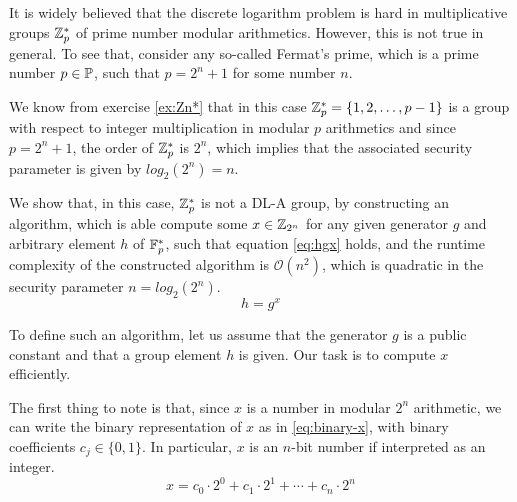 \begin{example} It is widely believed that the discrete logarithm problem is hard in multiplicative groups $\mathbb{Z}_p^*$ of prime number modular arithmetics. However, this is not true in general. To see that, consider any so-called Fermat's prime, which is a prime number $p\in\mathbb{P}$, such that $p=2^n+1$ for some number $n$.

We know from exercise \ref{ex:Zn*} that in this case $\mathbb{Z}_p^* = \{1,2,\ldots, p-1\}$ is a group with respect to integer multiplication in modular $p$ arithmetics and since $p=2^n+1$, the order of $\mathbb{Z}_p^*$ is $2^n$, which implies that the associated security parameter is given by $log_2(2^n)=n$.

We show that, in this case, $\mathbb{Z}_p^*$ is not a DL-A group, by constructing an algorithm, which is able compute some $x\in\mathbb{Z}_{2^n}$ for any given generator $g$ and arbitrary element $h$ of $\mathbb{F}_p^*$, such that equation \ref{eq:hgx} holds, and the runtime complexity of the constructed algorithm is $\mathcal{O}(n^2)$, which is quadratic in the security parameter $n=log_2(2^n)$.
\begin{equation}\label{eq:hgx}
h = g^x
\end{equation}

To define such an algorithm, let us assume that the generator $g$ is a public constant and that a group element $h$ is given. Our task is to compute $x$ efficiently.

The first thing to note is that, since $x$ is a number in modular $2^n$ arithmetic, we can write the binary representation of $x$ as in \ref{eq:binary-x}, with binary coefficients $c_j\in\{0,1\}$. In particular, $x$ is an $n$-bit number if interpreted as an integer.
\begin{equation}\label{eq:binary-x}
x = c_0\cdot 2^0 + c_1\cdot 2^1 + \cdots + c_n \cdot 2^n
\end{equation}



\end{example}

